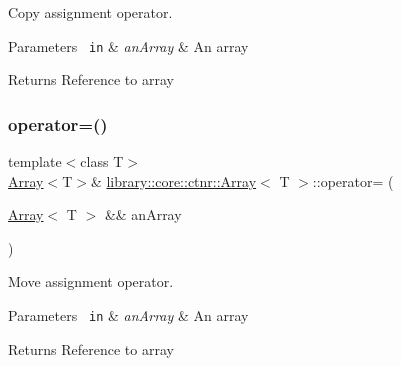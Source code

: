 Copy assignment operator. 


\begin{DoxyParams}[1]{Parameters}
\mbox{\texttt{ in}}  & {\em an\+Array} & An array \\
\hline
\end{DoxyParams}
\begin{DoxyReturn}{Returns}
Reference to array 
\end{DoxyReturn}
\mbox{\label{classlibrary_1_1core_1_1ctnr_1_1_array_a19f569e480439d489cf280678899498e}} 
\subsubsection{\texorpdfstring{operator=()}{operator=()}\hspace{0.1cm}{\footnotesize\ttfamily [2/2]}}
{\footnotesize\ttfamily template$<$class T$>$ \\
\mbox{\hyperlink{classlibrary_1_1core_1_1ctnr_1_1_array}{Array}}$<$T$>$\& \mbox{\hyperlink{classlibrary_1_1core_1_1ctnr_1_1_array}{library\+::core\+::ctnr\+::\+Array}}$<$ T $>$\+::operator= (\begin{DoxyParamCaption}\item[{\mbox{\hyperlink{classlibrary_1_1core_1_1ctnr_1_1_array}{Array}}$<$ T $>$ \&\&}]{an\+Array }\end{DoxyParamCaption})\hspace{0.3cm}{\ttfamily [default]}}



Move assignment operator. 


\begin{DoxyParams}[1]{Parameters}
\mbox{\texttt{ in}}  & {\em an\+Array} & An array \\
\hline
\end{DoxyParams}
\begin{DoxyReturn}{Returns}
Reference to array 
\end{DoxyReturn}
\mbox{\label{classlibrary_1_1core_1_1ctnr_1_1_array_a4636763515f791d0b9da1dfa205a65b1}} 
